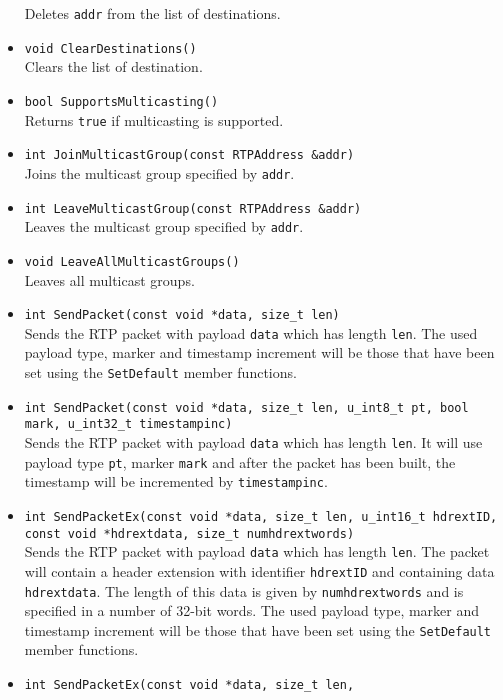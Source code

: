 \documentclass[12pt,a4paper]{article}
\begin{document}
\begin{itemize}
						Deletes {\tt addr} from the list of destinations.
					\item {\tt void ClearDestinations()}\\
						Clears the list of destination.
					\item {\tt bool SupportsMulticasting()}\\
						Returns {\tt true} if multicasting is supported.
					\item {\tt int JoinMulticastGroup(const RTPAddress \&addr)}\\
						Joins the multicast group specified by {\tt addr}.
					\item {\tt int LeaveMulticastGroup(const RTPAddress \&addr)}\\
						Leaves the multicast group specified by {\tt addr}.
					\item {\tt void LeaveAllMulticastGroups()}\\
						Leaves all multicast groups.
					\item {\tt int SendPacket(const void *data, size\_t len)}\\
						Sends the RTP packet with payload {\tt data} which has length {\tt len}.
						The used payload type, marker and timestamp increment will be those that
						have been set using the {\tt SetDefault} member functions.
					\item {\tt int SendPacket(const void *data, size\_t len,
					                          u\_int8\_t pt, bool mark, u\_int32\_t timestampinc)}\\
						Sends the RTP packet with payload {\tt data} which has length {\tt len}.
						It will use payload type {\tt pt}, marker {\tt mark} and after the packet
						has been built, the timestamp will be incremented by {\tt timestampinc}.
					\item {\tt int SendPacketEx(const void *data, size\_t len,
					                            u\_int16\_t hdrextID, const void *hdrextdata, size\_t numhdrextwords)}\\
						Sends the RTP packet with payload {\tt data} which has length {\tt len}.
						The packet will contain a header extension with identifier {\tt hdrextID} and
						containing data {\tt hdrextdata}. The length of this data is given by
						{\tt numhdrextwords} and is specified in a number of 32-bit words.
						The used payload type, marker and timestamp increment will be those that
						have been set using the {\tt SetDefault} member functions.
					\item {\tt int SendPacketEx(const void *data, size\_t len,
}
\end{itemize}
\end{document}
